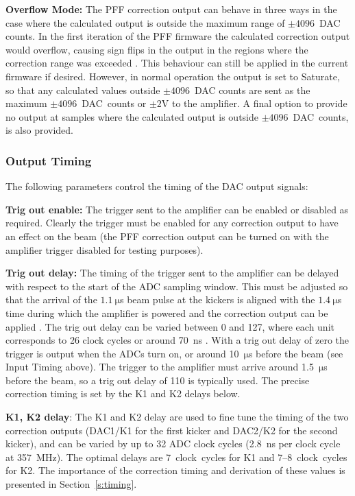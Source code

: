 \textbf{Overflow Mode:} The PFF correction output can behave in three ways in the case where the calculated output is outside the maximum range of \(\pm4096\)~DAC counts. In the first iteration of the PFF firmware the calculated correction output would overflow, causing sign flips in the output in the regions where the correction range was exceeded \cite{glennPriv}. This behaviour can still be applied in the current firmware if desired. However, in normal operation the output is set to Saturate, so that any calculated values outside \(\pm4096\)~DAC counts are sent as the maximum \(\pm4096\)~DAC~counts or \(\pm2\)V to the amplifier. A final option to provide no output at samples where the calculated output is outside \(\pm4096\)~DAC~counts, is also provided.

\subsubsection{Output Timing}

The following parameters control the timing of the DAC output signals:

\textbf{Trig out enable:} The trigger sent to the amplifier can be enabled or disabled as required. Clearly the trigger must be enabled for any correction output to have an effect on the beam (the PFF correction output can be turned on with the amplifier trigger disabled for testing purposes).

\textbf{Trig out delay:} The timing of the trigger sent to the amplifier can be delayed with respect to the start of the ADC sampling window. This must be adjusted so that the arrival of the \(1.1~\mathrm{\mu}\)s beam pulse at the kickers is aligned with the \(1.4~\mathrm{\mu}\)s time during which the amplifier is powered and the correction output can be applied \cite{colinPriv}. The trig out delay can be varied between 0 and 127, where each unit corresponds to 26 clock cycles or around 70~ns \cite{glennPriv}. With a trig out delay of zero the trigger is output when the ADCs turn on, or around 10~\(\mathrm{\mu}\)s before the beam (see Input Timing above). The trigger to the amplifier must arrive around 1.5~\(\mathrm{\mu}\)s before the beam, so a trig out delay of 110 is typically used. The precise correction timing is set by the K1 and K2 delays below.

\textbf{K1, K2 delay}: The K1 and K2 delay are used to fine tune the timing of the two correction outputs (DAC1/K1 for the first kicker and DAC2/K2 for the second kicker), and can be varied by up to 32 ADC clock cycles (2.8~ns per clock cycle at 357~MHz). The optimal delays are 7~clock~cycles for K1 and 7--8~clock~cycles for K2. The importance of the correction timing and derivation of these values is presented in Section~\ref{s:timing}.

